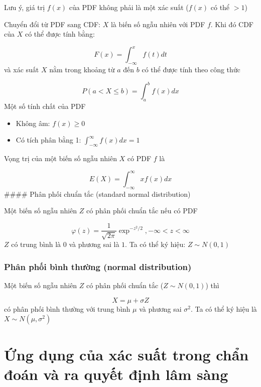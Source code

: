 \documentclass[
]{book}
\providecommand{\tightlist}{%
  \setlength{\itemsep}{0pt}\setlength{\parskip}{0pt}}
\begin{document}
Lưu ý, giá trị \(f(x)\) của PDF không phải là một xác suất (\(f(x)\) có thể \(>1\))

Chuyển đổi từ PDF sang CDF: \(X\) là biến số ngẫu nhiên với PDF \(f\). Khi đó CDF của \(X\) có thể được tính bằng:

\[
F(x) = \int^x_{-\infty} f(t)dt
\]
và xác suất \(X\) nằm trong khoảng từ \(a\) đến \(b\) có thể được tính theo công thức

\[
P(a < X \leq b) = \int^b_{a} f(x)dx
\]
Một số tính chất của PDF

\begin{itemize}
\tightlist
\item
  Không âm: \(f(x) \geq 0\)
\item
  Có tích phân bằng 1: \(\int_{-\infty}^{\infty}f(x)dx = 1\)
\end{itemize}

Vọng trị của một biến số ngẫu nhiên \(X\) có PDF \(f\) là

\[
E(X) = \int_{-\infty}^{\infty} xf(x)dx
\]
\#\#\#\# Phân phối chuẩn tắc (standard normal distribution)

Một biến số ngẫu nhiên \(Z\) có phân phối chuẩn tắc nếu có PDF

\[
\varphi(z) = \frac{1}{\sqrt{2\pi}}\exp^{-z^2/2}, -\infty < z < \infty
\]
\(Z\) có trung bình là \(0\) và phương sai là \(1\). Ta có thể ký hiệu: \(Z \sim N(0, 1)\)

\hypertarget{phuxe2n-phux1ed1i-buxecnh-thux1b0ux1eddng-normal-distribution}{%
\subsubsection{Phân phối bình thường (normal distribution)}\label{phuxe2n-phux1ed1i-buxecnh-thux1b0ux1eddng-normal-distribution}}

Một biến số ngẫu nhiên \(Z\) có phân phối chuẩn tắc (\(Z \sim N(0, 1)\)) thì

\[
X = \mu + \sigma Z
\]
có phân phối bình thường với trung bình \(\mu\) và phương sai \(\sigma^2\). Ta có thể ký hiệu là \(X \sim N(\mu, \sigma^2)\)

\hypertarget{ux1ee9ng-dux1ee5ng-cux1ee7a-xuxe1c-suux1ea5t-trong-chux1ea9n-ux111ouxe1n-vuxe0-ra-quyux1ebft-ux111ux1ecbnh-luxe2m-suxe0ng}{%
\section{Ứng dụng của xác suất trong chẩn đoán và ra quyết định lâm sàng}\label{ux1ee9ng-dux1ee5ng-cux1ee7a-xuxe1c-suux1ea5t-trong-chux1ea9n-ux111ouxe1n-vuxe0-ra-quyux1ebft-ux111ux1ecbnh-luxe2m-suxe0ng}}
\end{document}
